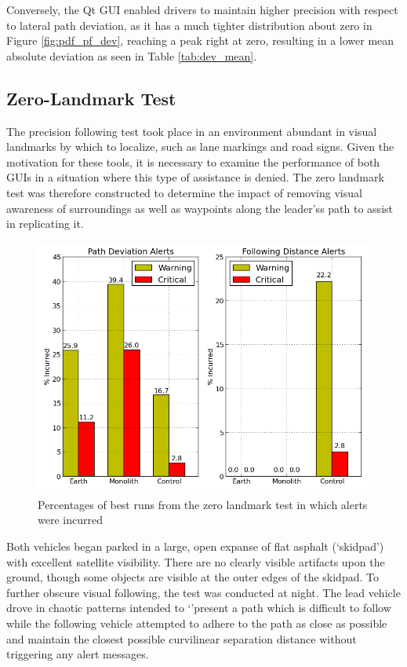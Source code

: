 \documentclass[twocolumn,10pt]{article}
\begin{document}
    Conversely, the Qt GUI enabled drivers to maintain higher precision with respect to lateral path deviation, as it has a much tighter distribution about zero in Figure \ref{fig:pdf_pf_dev}, reaching a peak right at zero, resulting in a lower mean absolute deviation as seen in Table \ref{tab:dev_mean}.



  \subsection*{Zero-Landmark Test}

    The precision following test took place in an environment abundant in visual landmarks by which to localize, such as lane markings and road signs.  Given the motivation for these tools, it is necessary to examine the performance of both GUIs in a situation where this type of assistance is denied.  The zero landmark test was therefore constructed to determine the impact of removing visual awareness of surroundings as well as waypoints along the leader'ss path to assist in replicating it.
    
    \begin{figure}[ht] \centering
      \includegraphics[width=\columnwidth]{../graphics/zero_landmark_alert_percents.png}
      \caption{Percentages of best runs from the zero landmark test in which alerts were incurred}
      \label{fig:zero_landmark_alert_percents}
    \end{figure}

    Both vehicles began parked in a large, open expanse of flat asphalt (`skidpad') with excellent satellite visibility.  There are no clearly visible artifacts upon the ground, though some objects are visible at the outer edges of the skidpad.  To further obscure visual following, the test was conducted at night.  The lead vehicle drove in chaotic patterns intended to `'present a path which is difficult to follow while the following vehicle attempted to adhere to the path as close as possible and maintain the closest possible curvilinear separation distance without triggering any alert messages.
\end{document}
